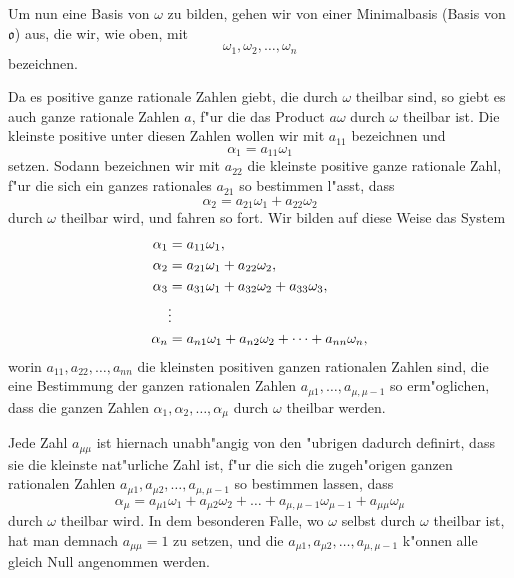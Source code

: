 \documentclass[12pt,a4paper]{article}
\theoremstyle{definition}
\begin{document}
Um nun eine Basis von $\omega$ zu bilden, gehen wir von einer Minimalbasis (Basis von $\mathfrak{o}$) aus, die wir, wie oben, mit
\begin{equation}
\omega_1, \omega_2, \dots, \omega_n
\end{equation}
bezeichnen.

Da es positive ganze rationale Zahlen giebt, die durch $\omega$ theilbar sind, so giebt es auch ganze rationale Zahlen $a$, f"ur die das Product $a\omega$ durch $\omega$ theilbar ist. Die kleinste positive unter diesen Zahlen wollen wir mit $a_{11}$ bezeichnen und
\begin{equation}
\alpha_1 = a_{11}\omega_1
\end{equation}
setzen. Sodann bezeichnen wir mit $a_{22}$ die kleinste positive ganze rationale Zahl, f"ur die sich ein ganzes rationales $a_{21}$ so bestimmen l"asst, dass
\begin{equation}
\alpha_2 = a_{21}\omega_1 + a_{22}\omega_2
\end{equation}
durch $\omega$ theilbar wird, und fahren so fort. Wir bilden auf diese Weise das System
\begin{align}
\alpha_1 &= a_{11}\omega_1, \notag \\
\alpha_2 &= a_{21}\omega_1 + a_{22}\omega_2, \notag \\
\alpha_3 &= a_{31}\omega_1 + a_{32}\omega_2 + a_{33}\omega_3, \\
&\vdots \notag \\
\alpha_n &= a_{n1}\omega_1 + a_{n2}\omega_2 + \dots + a_{nn}\omega_n, \notag
\end{align}
worin $a_{11}, a_{22}, \dots, a_{nn}$ die kleinsten positiven ganzen rationalen Zahlen sind, die eine Bestimmung der ganzen rationalen Zahlen $a_{\mu 1}, \dots, a_{\mu,\mu-1}$ so erm"oglichen, dass die ganzen Zahlen $\alpha_1, \alpha_2, \dots, \alpha_\mu$ durch $\omega$ theilbar werden.

Jede Zahl $a_{\mu\mu}$ ist hiernach unabh"angig von den "ubrigen dadurch definirt, dass sie die kleinste nat"urliche Zahl ist, f"ur die sich die zugeh"origen ganzen rationalen Zahlen $a_{\mu 1}, a_{\mu 2}, \dots, a_{\mu,\mu-1}$ so bestimmen lassen, dass
\begin{equation}
\alpha_\mu = a_{\mu 1}\omega_1 + a_{\mu 2}\omega_2 + \dots + a_{\mu,\mu-1}\omega_{\mu-1} + a_{\mu\mu}\omega_\mu
\end{equation}
durch $\omega$ theilbar wird. In dem besonderen Falle, wo $\omega$ selbst durch $\omega$ theilbar ist, hat man demnach $a_{\mu\mu} = 1$ zu setzen, und die $a_{\mu 1}, a_{\mu 2}, \dots, a_{\mu,\mu-1}$ k"onnen alle gleich Null angenommen werden.
\end{document}
